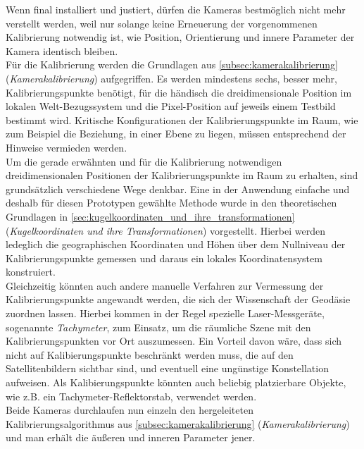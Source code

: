 Wenn final installiert und justiert, dürfen die Kameras bestmöglich nicht mehr verstellt werden, weil nur solange keine Erneuerung der vorgenommenen Kalibrierung notwendig ist, wie Position, Orientierung und innere Parameter der Kamera identisch bleiben.\\
Für die Kalibrierung werden die Grundlagen aus \ref{subsec:kamerakalibrierung} (\emph{Kamerakalibrierung}) aufgegriffen. Es werden mindestens sechs, besser mehr, Kalibrierungspunkte benötigt, für die händisch die dreidimensionale Position im lokalen Welt-Bezugssystem und die Pixel-Position auf jeweils einem Testbild bestimmt wird. Kritische Konfigurationen der Kalibrierungspunkte im Raum, wie zum Beispiel die Beziehung, in einer Ebene zu liegen, müssen entsprechend der Hinweise vermieden werden.\\
Um die gerade erwähnten und für die Kalibrierung notwendigen dreidimensionalen Positionen der Kalibrierungspunkte im Raum zu erhalten, sind grundsätzlich verschiedene Wege denkbar. Eine in der Anwendung einfache und deshalb für diesen Prototypen gewählte Methode wurde in den theoretischen Grundlagen in \ref{sec:kugelkoordinaten_und_ihre_transformationen} (\emph{Kugelkoordinaten und ihre Transformationen}) vorgestellt. Hierbei werden ledeglich die geographischen Koordinaten und Höhen über dem Nullniveau der Kalibrierungspunkte gemessen und daraus ein lokales Koordinatensystem konstruiert.\\
Gleichzeitig könnten auch andere manuelle Verfahren zur Vermessung der Kalibrierungspunkte angewandt werden, die sich der Wissenschaft der Geodäsie zuordnen lassen. Hierbei kommen in der Regel spezielle Laser-Messgeräte, sogenannte \emph{Tachymeter}, zum Einsatz, um die räumliche Szene mit den Kalibrierungspunkten vor Ort auszumessen. Ein Vorteil davon wäre, dass sich nicht auf Kalibierungspunkte beschränkt werden muss, die auf den Satellitenbildern sichtbar sind, und eventuell eine ungünstige Konstellation aufweisen. Als Kalibierungspunkte könnten auch beliebig platzierbare Objekte, wie z.B. ein Tachymeter-Reflektorstab, verwendet werden.\\
Beide Kameras durchlaufen nun einzeln den hergeleiteten Kalibrierungsalgorithmus aus \ref{subsec:kamerakalibrierung} (\emph{Kamerakalibrierung}) und man erhält die äußeren und inneren Parameter jener.
